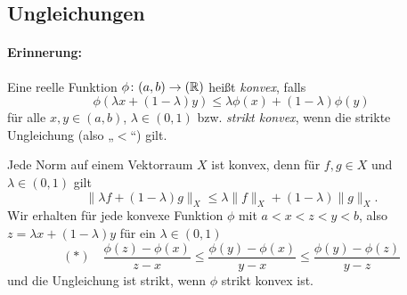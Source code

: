 \documentclass[skript.tex]{subfiles}
\begin{document}
	\subsection*{Ungleichungen}
	\paragraph{Erinnerung:} Eine reelle Funktion $\phi\colon(a,b)\to(\mathbb{R})$ heißt \emph{konvex}, falls
	\[
		\phi(\lambda x + (1-\lambda)y) \leq \lambda \phi(x) + (1-\lambda) \phi(y)
	\]
	für alle $x,y \in (a,b)$, $\lambda\in(0,1)$ bzw. \emph{strikt konvex}, wenn die strikte Ungleichung (also „$<$“) gilt.
	\begin{center}
	\end{center}
	Jede Norm auf einem Vektorraum $X$ ist konvex, denn für $f,g \in X$ und $\lambda \in (0,1)$ gilt
	\[
		\lVert \lambda f+(1-\lambda)g \rVert_X \leq \lambda \lVert f \rVert_X + (1-\lambda) \lVert g \rVert_X.
	\]
	Wir erhalten für jede konvexe Funktion $\phi$ mit $a<x<z<y<b$, also $z=\lambda x+(1-\lambda)y$ für ein $\lambda\in(0,1)$
	\[
		(\ast)\quad
		\frac{\phi(z)-{\phi(x)}}{z-x}
		\leq \frac{\phi(y)-{\phi(x)}}{y-x}
		\leq \frac{\phi(y)-{\phi(z)}}{y-z}
	\]
	und die Ungleichung ist strikt, wenn $\phi$ strikt konvex ist.
	
\end{document}
